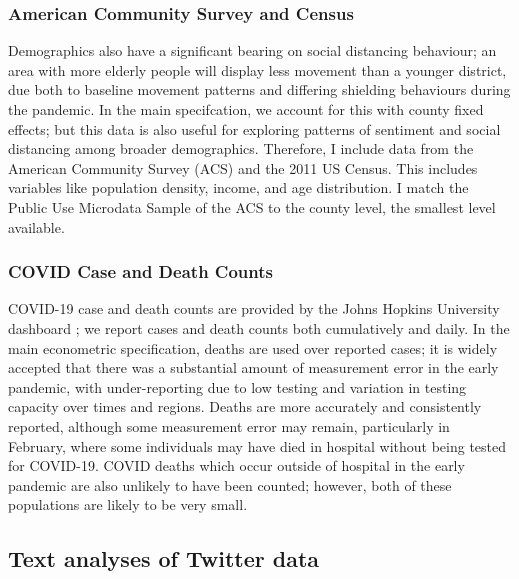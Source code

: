 \documentclass{article}
\begin{document}
\subsubsection{American Community Survey and Census}
Demographics also have a significant bearing on social distancing behaviour; an area with more elderly people will display less movement than a younger district, due both to baseline movement patterns and differing shielding behaviours during the pandemic. In the main specifcation, we account for this with county fixed effects; but this data is also useful for exploring patterns of sentiment and social distancing among broader demographics. Therefore, I include data from the American Community Survey (ACS) and the 2011 US Census. This includes variables like population density, income, and age distribution. I match the Public Use Microdata Sample of the ACS to the county level, the smallest level available. 

\subsubsection{COVID Case and Death Counts}
COVID-19 case and death counts are provided by the Johns Hopkins University dashboard \textcite{dongInteractiveWebbasedDashboard2020}; we report cases and death counts both cumulatively and daily. In the main econometric specification, deaths are used over reported cases; it is widely accepted that there was a substantial amount of measurement error in the early pandemic, with under-reporting due to low testing and variation in testing capacity over times and regions. Deaths are more accurately and consistently reported, although some measurement error may remain, particularly in February, where some individuals may have died in hospital without being tested for COVID-19. COVID deaths which occur outside of hospital in the early pandemic are also unlikely to have been counted; however, both of these populations are likely to be very small. 




\subsection{Text analyses of Twitter data}\label{approach}
\end{document}
